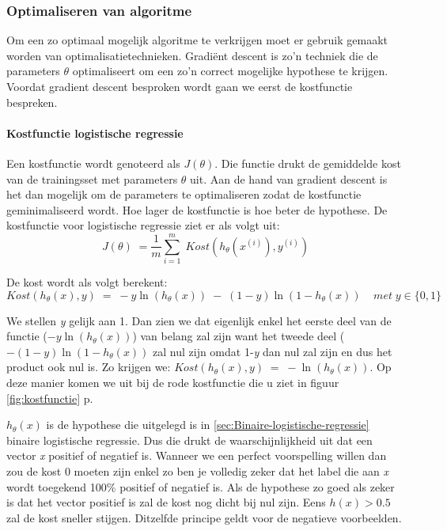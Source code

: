 \subsubsection{Optimaliseren van algoritme}
\label{sec:Optimaliseren-algoritme}
Om een zo optimaal mogelijk algoritme te verkrijgen moet er gebruik gemaakt worden van optimalisatietechnieken. Gradiënt descent is zo'n techniek die de parameters $\theta$ optimaliseert om een zo'n correct mogelijke hypothese te krijgen. Voordat gradient descent besproken wordt gaan we eerst de kostfunctie bespreken. 

\paragraph{Kostfunctie logistische regressie}
\label{par:kostfunctie-log}
Een kostfunctie wordt genoteerd als $J(\theta)$. Die functie drukt de gemiddelde kost van de trainingsset met parameters $\theta$ uit. Aan de hand van gradient descent is het dan mogelijk om de parameters te optimaliseren zodat de kostfunctie geminimaliseerd wordt. Hoe lager de kostfunctie is hoe beter de hypothese.
De kostfunctie voor logistische regressie ziet er als volgt uit: 
$$ 
J(\theta) \; = \frac{1}{m}\sum_{i=1}^{m} \;   Kost (h_{\theta}(x^{(i)}), y^{(i)} )  
$$

De kost wordt als volgt berekent:
$$Kost (h_{\theta}(x), y) \; = \; -y\ln(h_{\theta}(x)) \;- \;(1-y) \ln(1-h_{\theta}(x))  \;\;\;\; met \; y \in \{0,1\}$$

We stellen \textit{y} gelijk aan 1. Dan zien we dat eigenlijk enkel het eerste deel van de functie ($-y\ln(h_{\theta}(x))$) van belang zal zijn want het tweede deel ($- (1-y) \ln(1-h_{\theta}(x))$ zal nul zijn omdat 1-\textit{y} dan nul zal zijn en dus het product ook nul is. Zo krijgen we: 
\newline $Kost (h_{\theta}(x), y) \; = \; -\ln(h_{\theta}(x))$. Op deze manier komen we uit bij de rode kostfunctie die u ziet in figuur \ref{fig:kostfunctie} p\pageref{fig:kostfunctie}.

$h_{\theta}(x)$ is de hypothese die uitgelegd is in \ref{sec:Binaire-logistische-regressie} binaire logistische regressie. Dus die drukt de waarschijnlijkheid uit dat een vector \textit{x} positief of negatief is. Wanneer we een perfect voorspelling willen dan zou de kost 0 moeten zijn enkel zo ben je volledig zeker dat het label die aan \textit{x} wordt toegekend 100\% positief of negatief is. Als de hypothese zo goed als zeker is dat het vector positief is zal de kost nog dicht bij nul zijn. Eens $h(x) > 0.5$ zal de kost sneller stijgen. Ditzelfde principe geldt voor de negatieve voorbeelden. 

